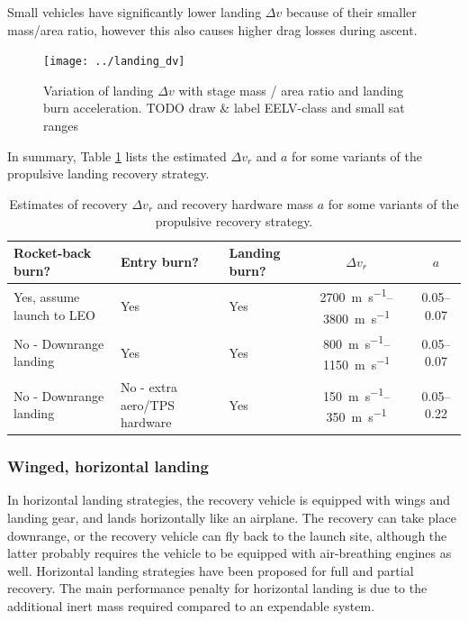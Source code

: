 \documentclass[conf]{new-aiaa}
\begin{document}
Small vehicles have significantly lower landing $\Delta v$ because of their smaller mass/area ratio, however this also causes higher drag losses during ascent.

\begin{figure}[hbt!]
	\centering
	\texttt{[image: ../landing\_dv]}
	\label{fig:landing_dv}
	\caption{Variation of landing $\Delta v$ with stage mass / area ratio and landing burn acceleration. TODO draw \& label EELV-class and small sat ranges}
\end{figure}

In summary, Table \ref{tab:propulsive_strategies} lists the estimated $\Delta v_r$ and $a$ for some variants of the propulsive landing recovery strategy.

\begin{table}
	\caption{\label{tab:propulsive_strategies} Estimates of recovery $\Delta v_r$ and recovery hardware mass $a$ for some variants of the propulsive recovery strategy.}
	\centering
	\begin{tabular}{p{3cm} p{3cm} p{2cm} c c}
		Rocket-back burn? & Entry burn? & Landing burn? & $\Delta v_r$ & $a$ \\
		\hline
		Yes, assume launch to LEO & Yes & Yes & \SIrange{2700}{3800}{\meter\per\second} & \SIrange{0.05}{0.07}{}\\
		No - Downrange landing & Yes & Yes & \SIrange{800}{1150}{\meter\per\second} & \SIrange{0.05}{0.07}{} \\
		No - Downrange landing & No - extra aero/TPS hardware & Yes & \SIrange{150}{350}{\meter\per\second} & \SIrange{0.05}{0.22}{}\\
		\hline
	\end{tabular}
\end{table}


\subsubsection{Winged, horizontal landing}
In horizontal landing strategies, the recovery vehicle is equipped with wings and landing gear, and lands horizontally like an airplane. The recovery can take place downrange, or the recovery vehicle can fly back to the launch site, although the latter probably requires the vehicle to be equipped with air-breathing engines as well. Horizontal landing strategies have been proposed for full and partial recovery. The main performance penalty for horizontal landing is due to the additional inert mass required compared to an expendable system.
\end{document}
